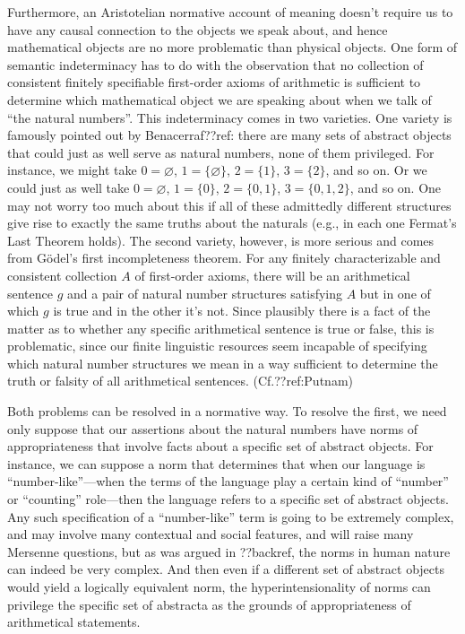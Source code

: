 Furthermore, an Aristotelian normative account of meaning doesn't require us to have any causal connection to the objects we speak about, and hence mathematical objects
are no more problematic than physical objects. One form of semantic indeterminacy has to do with the observation that no collection of consistent finitely specifiable first-order axioms of arithmetic is sufficient 
to determine which mathematical object we are speaking about when we talk of ``the natural numbers''. This indeterminacy
comes in two varieties. One variety is famously pointed out by Benacerraf??ref: there are many sets of abstract objects
that could just as well serve as natural numbers, none of them privileged. For instance, we might take $0=\varnothing$,
$1=\{ \varnothing \}$, $2=\{ 1 \}$, $3=\{ 2\}$, and so on. Or we could just as well take $0=\varnothing$, $1=\{ 0 \}$,
$2=\{ 0,1 \}$, $3=\{0,1,2\}$, and so on. One may not worry too much about this if all of these admittedly different
structures give rise to exactly the same truths about the naturals (e.g., in each one Fermat's Last Theorem holds).
The second variety, however, is more serious and comes from G\"odel's first incompleteness theorem. 
For any finitely characterizable and consistent collection $A$ of first-order axioms, there will be an arithmetical
sentence $g$ and a pair of natural number structures satisfying $A$ but in one of which $g$ is true and in the
other it's not. Since plausibly there is a fact of the matter as to whether any specific arithmetical sentence
is true or false, this is problematic, since our finite linguistic resources seem incapable of specifying which
natural number structures we mean in a way sufficient to determine the truth or falsity of all arithmetical sentences. (Cf.??ref:Putnam) 

Both problems can be resolved in a normative way. To resolve the first, we need only suppose that our assertions
about the natural numbers have norms of appropriateness that involve facts about a specific set of abstract objects.
For instance, we can suppose a norm that determines that 
when our language is ``number-like''---when the terms of the language play a certain kind of ``number'' or ``counting'' role---then
the language refers to a specific set of abstract objects. Any such specification of a ``number-like'' term is going
to be extremely complex, and may involve many contextual and social features, and will raise many Mersenne questions,
but as was argued in ??backref, the norms in human nature can indeed be very complex. 
And then even if a different set of abstract objects would yield a logically equivalent norm, the hyperintensionality of
norms can privilege the specific set of abstracta as the grounds of appropriateness of arithmetical statements.


